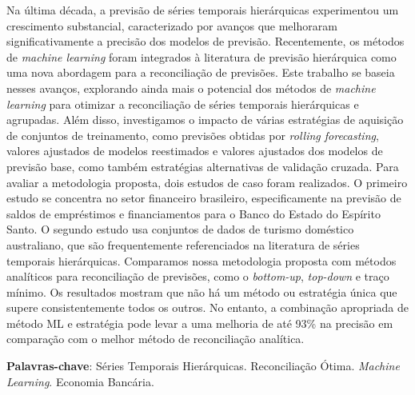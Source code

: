 
\setlength{\absparsep}{18pt}
\begin{resumo}
  Na última década, a previsão de séries temporais hierárquicas experimentou um crescimento substancial, caracterizado por avanços que melhoraram significativamente a precisão dos modelos de previsão. Recentemente, os métodos de \textit{machine learning} foram integrados à literatura de previsão hierárquica como uma nova abordagem para a reconciliação de previsões. Este trabalho se baseia nesses avanços, explorando ainda mais o potencial dos métodos de \textit{machine learning} para otimizar a reconciliação de séries temporais hierárquicas e agrupadas. Além disso, investigamos o impacto de várias estratégias de aquisição de conjuntos de treinamento, como previsões obtidas por \textit{rolling forecasting}, valores ajustados de modelos reestimados e valores ajustados dos modelos de previsão base, como também estratégias alternativas de validação cruzada. Para avaliar a metodologia proposta, dois estudos de caso foram realizados. O primeiro estudo se concentra no setor financeiro brasileiro, especificamente na previsão de saldos de empréstimos e financiamentos para o Banco do Estado do Espírito Santo. O segundo estudo usa conjuntos de dados de turismo doméstico australiano, que são frequentemente referenciados na literatura de séries temporais hierárquicas. Comparamos nossa metodologia proposta com métodos analíticos para reconciliação de previsões, como o \textit{bottom-up}, \textit{top-down} e traço mínimo. Os resultados mostram que não há um método ou estratégia única que supere consistentemente todos os outros. No entanto, a combinação apropriada de método ML e estratégia pode levar a uma melhoria de até 93\% na precisão em comparação com o melhor método de reconciliação analítica.

  \textbf{Palavras-chave}: Séries Temporais Hierárquicas. Reconciliação Ótima. \textit{Machine Learning}. Economia Bancária.
\end{resumo}

